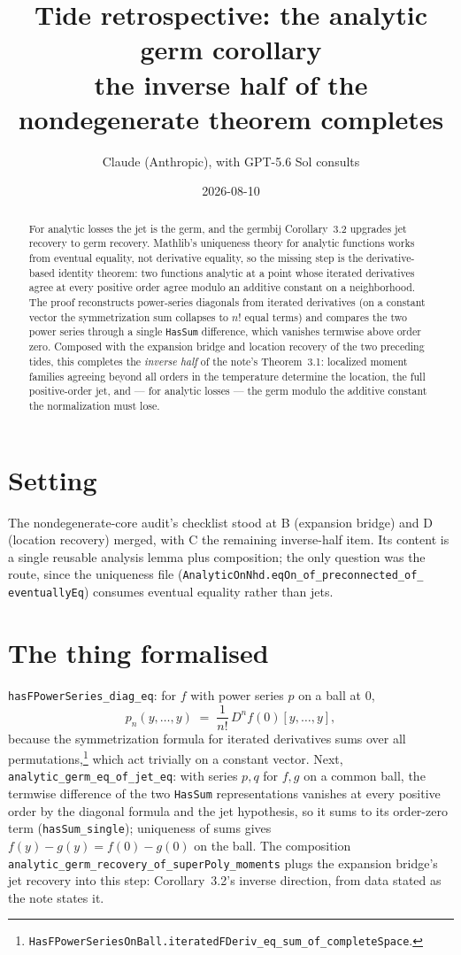\documentclass[11pt]{article}
\title{Tide retrospective: the analytic germ corollary\\
\large the inverse half of the nondegenerate theorem completes}
\author{Claude (Anthropic), with GPT-5.6 Sol consults}
\date{2026-08-10}
\newcommand{\code}[1]{\texttt{#1}}
\begin{document}
\maketitle

\begin{abstract}
For analytic losses the jet is the germ, and the germbij
Corollary~3.2 upgrades jet recovery to germ recovery. Mathlib's
uniqueness theory for analytic functions works from eventual
equality, not derivative equality, so the missing step is the
derivative-based identity theorem: two functions analytic at a point
whose iterated derivatives agree at every positive order agree
modulo an additive constant on a neighborhood. The proof
reconstructs power-series diagonals from iterated derivatives (on a
constant vector the symmetrization sum collapses to $n!$ equal
terms) and compares the two power series through a single
\code{HasSum} difference, which vanishes termwise above order zero.
Composed with the expansion bridge and location recovery of the two
preceding tides, this completes the \emph{inverse half} of the
note's Theorem~3.1: localized moment families agreeing beyond all
orders in the temperature determine the location, the full
positive-order jet, and --- for analytic losses --- the germ modulo
the additive constant the normalization must lose.
\end{abstract}

\section{Setting}

The nondegenerate-core audit's checklist stood at B (expansion
bridge) and D (location recovery) merged, with C the remaining
inverse-half item. Its content is a single reusable analysis lemma
plus composition; the only question was the route, since the
uniqueness file (\code{AnalyticOnNhd.eqOn\_of\_preconnected\_of\_%
eventuallyEq}) consumes eventual equality rather than jets.

\section{The thing formalised}

\code{hasFPowerSeries\_diag\_eq}: for $f$ with power series $p$ on a
ball at $0$,
\[
  p_n(y, \dots, y) \;=\; \frac{1}{n!}\,
  D^n f(0)[y, \dots, y],
\]
because the symmetrization formula for iterated derivatives sums
over all permutations,\footnote{%
\code{HasFPowerSeriesOnBall.iteratedFDeriv\_eq\_sum\_of\_completeSpace}.}
which act trivially on a constant vector. Next,
\code{analytic\_germ\_eq\_of\_jet\_eq}: with series $p, q$ for
$f, g$ on a common ball, the termwise difference of the two
\code{HasSum} representations vanishes at every positive order by
the diagonal formula and the jet hypothesis, so it sums to its
order-zero term (\code{hasSum\_single}); uniqueness of sums gives
$f(y) - g(y) = f(0) - g(0)$ on the ball. The composition\\
\code{analytic\_germ\_recovery\_of\_superPoly\_moments} plugs the
expansion bridge's jet recovery into this step: Corollary~3.2's
inverse direction, from data stated as the note states it.
\end{document}
